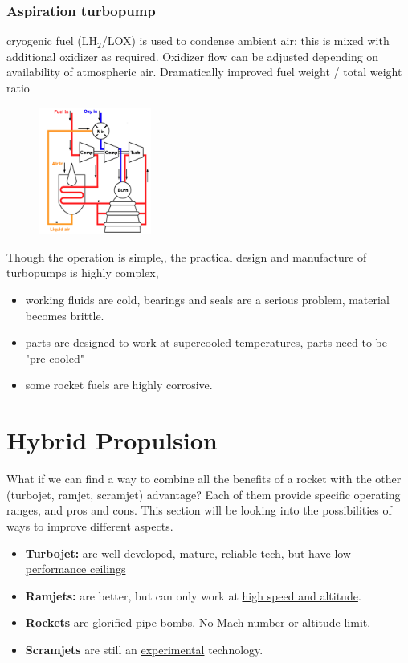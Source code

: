 \documentclass[a4paper,10pt]{article}
\begin{document}
\begin{multicols}{2}
\subsubsection{Aspiration turbopump}
cryogenic fuel (LH$_2$/LOX) is used to condense ambient air; this is mixed with additional oxidizer as required. Oxidizer flow can be adjusted depending on availability of atmospheric air. Dramatically improved fuel weight / total weight ratio 
\begin{figure}[H]
    \centering
    \includegraphics[width=0.33\textwidth]{Figure/aspiration.png}
\end{figure}
\end{multicols}

Though the operation is simple,, the practical design and manufacture of turbopumps is highly complex,
\begin{itemize}
    \item working fluids are cold, bearings and seals are a serious problem, material becomes brittle.
    \item parts are designed to work at supercooled temperatures, parts need to be "pre-cooled"
    \item some rocket fuels are highly corrosive. 
\end{itemize}


\newpage
\section{Hybrid Propulsion}
What if we can find a way to combine all the benefits of a rocket with the other (turbojet, ramjet, scramjet) advantage? Each of them provide specific operating ranges, and pros and cons. This section will be looking into the possibilities of ways to improve different aspects.
\begin{itemize}
    \item \textbf{Turbojet:} are well-developed, mature, reliable tech, but have \underline{low performance ceilings}
    \item \textbf{Ramjets:} are better, but can only work at \underline{high speed and altitude}. 
    \item \textbf{Rockets} are glorified \underline{pipe bombs}. No Mach number or altitude limit. 
    \item \textbf{Scramjets} are still an \underline{experimental} technology.
\end{itemize}
\end{document}
